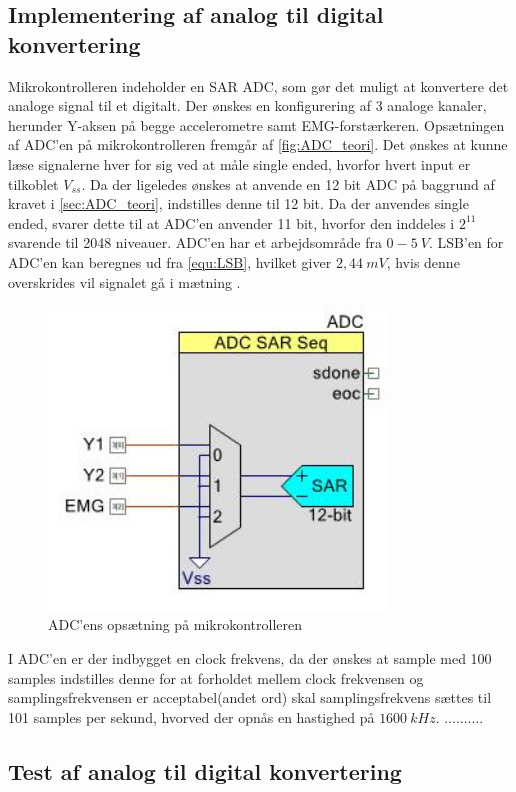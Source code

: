\subsection{Implementering af analog til digital konvertering}
Mikrokontrolleren indeholder en SAR ADC, som gør det muligt at konvertere det analoge signal til et digitalt. Der ønskes en konfigurering af 3 analoge kanaler, herunder Y-aksen på begge accelerometre samt EMG-forstærkeren. Opsætningen af ADC'en på mikrokontrolleren fremgår af \autoref{fig:ADC_teori}. Det ønskes at kunne læse signalerne hver for sig ved at måle single ended, hvorfor hvert input er tilkoblet $V_{ss}$. Da der ligeledes ønskes at anvende en 12 bit ADC på baggrund af kravet i \autoref{sec:ADC_teori}, indstilles denne til 12 bit. Da der anvendes single ended, svarer dette til at ADC'en anvender 11 bit, hvorfor den inddeles i $2^{11}$ svarende til 2048 niveauer. ADC'en har et arbejdsområde fra $0-5~V$. LSB'en for ADC'en kan beregnes ud fra \autoref{equ:LSB}, hvilket giver $2,44~mV$, hvis denne overskrides vil signalet gå i mætning \citep{ADC2014}. 

\begin{figure}[H]
\centering
\includegraphics[width=0.8\textwidth]{figures/implementering/ADC_imp.jpeg}
\caption{ADC'ens opsætning på mikrokontrolleren}
\label{fig:ADC_teori}
\end{figure}

I ADC'en er der indbygget en clock frekvens, da der ønskes at sample med 100 samples indstilles denne for at forholdet mellem clock frekvensen og samplingsfrekvensen er acceptabel(andet ord) skal samplingsfrekvens sættes til 101 samples per sekund, hvorved der opnås en hastighed på $1600~kHz$. ..........



\subsection{Test af analog til digital konvertering}
